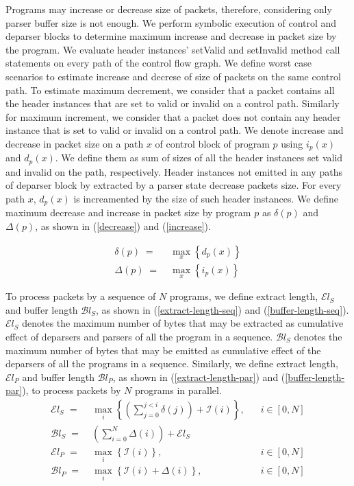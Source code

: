 \documentclass{hotnets19}
\begin{document}
Programs may increase or decrease size of packets, therefore, considering only parser buffer size is not enough.
We perform symbolic execution of control and deparser blocks to determine maximum increase and decrease in packet size by the program.
We evaluate header instances' setValid and setInvalid method call statements on every path of the control flow graph.
We define worst case scenarios to estimate increase and decrese of size of packets on the same control path.
To estimate maximum decrement, we consider that a packet contains all the header instances that are set to valid or invalid on a control path.
Similarly for maximum increment, we consider that a packet does not contain any header instance that is set to valid or invalid on a control path. 
We denote increase and decrease in packet size on a path $x$ of control block of program $p$ using $i_{p}(x)$ and $d_{p}(x)$.
We define them as sum of sizes of all the header instances set valid and invalid on the path, respectively.
Header instances not emitted in any paths of deparser block by extracted by a parser state decrease packets size. 
For every path $x$, $d_{p}(x)$ is increamented by the size of such header instances. 
We define maximum decrease and increase in packet size by program $p$ as $\delta(p)$ and $\Delta(p)$, as shown in (\ref{decrease}) and (\ref{increase}).


\begin{align}
\delta(p)\; =& \;  \max_{x} \left\{ d_{p}(x) \right\} \label{decrease} \\
\Delta(p) \; =& \; \max_{x} \left\{ i_{p}(x) \right\} \label{increase}
\end{align}

To process packets by a sequence of $N$ programs, we define extract length, $\mathcal{E}l_{S}$ and buffer length $\mathcal{B}l_{S}$, as shown in (\ref{extract-length-seq}) and (\ref{buffer-length-seq}).
$\mathcal{E}l_{S}$ denotes the maximum number of bytes that may be extracted as cumulative effect of deparsers and parsers of all the program in a sequence.
$\mathcal{B}l_{S}$ denotes the maximum number of bytes that may be emitted as cumulative effect of the deparsers of all the programs in a sequence.
Similarly, we define extract length, $\mathcal{E}l_{P}$ and buffer length $\mathcal{B}l_{P}$, as shown in (\ref{extract-length-par}) and (\ref{buffer-length-par}), to process packets by $N$ programs in parallel.
\begin{align}
\mathcal{E}l_{S} \; =& \; \max_{i} \left\{ \left( \sum_{j=0}^{j<i} \delta(j) \right)+ \mathcal{I}(i) \right\},&\;\;\;i  \in [0,N] \label{extract-length-seq} \\
\mathcal{B}l_{S} \; =& \; \left( \sum_{i=0}^{N} \Delta(i) \right)+ \mathcal{E}l_{S} & \label{buffer-length-seq} \\
\mathcal{E}l_{P} \; =& \; \max_{i} \left\{ \mathcal{I}(i) \right\},&\;\;\;i  \in [0,N] \label{extract-length-par} \\
\mathcal{B}l_{P} \; =& \; \max_{i} \left\{ \mathcal{I}(i) + \Delta(i) \right\},&\;\;\;i  \in [0,N]  \label{buffer-length-par}
\end{align}
\end{document}
